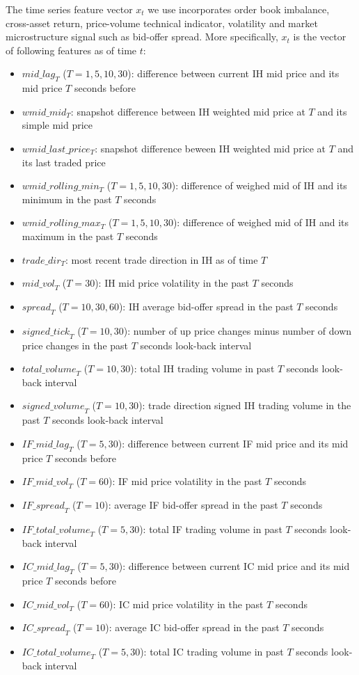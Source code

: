 \documentclass{article}
\begin{document}
The time series feature vector $x_t$ we use incorporates order book imbalance, cross-asset return, price-volume technical indicator, volatility and market microstructure signal such as bid-offer spread. More specifically, $x_t$ is the vector of following features as of time $t$:
\begin{itemize}
\setlength\itemsep{0.1em}
\item ${mid\_lag}_T$ ($T=1,5,10,30$): difference between current IH mid price and its mid price $T$ seconds before
\item ${wmid\_mid_T}$: snapshot difference between IH weighted mid price at $T$ and its simple mid price
\item ${wmid\_last\_price_T}$: snapshot difference beween IH weighted mid price at $T$ and its last traded price
\item ${wmid\_rolling\_min_T}$ ($T=1,5,10,30$):	difference of weighed mid of IH and its minimum in the past $T$ seconds
\item ${wmid\_rolling\_max_T}$ ($T=1,5,10,30$):	difference of weighed mid of IH and its maximum in the past $T$ seconds
\item ${trade\_dir_T}$: most recent trade direction in IH
as of time $T$
\item ${mid\_vol}_T$ ($T=30$): IH mid price volatility in the past $T$ seconds
\item ${spread}_T$ ($T=10,30,60$): IH average bid-offer spread in the past $T$ seconds
\item ${signed\_tick}_T$ ($T=10,30$): number of up price changes minus number of down price changes in the past $T$ seconds look-back interval
\item ${total\_volume}_T$ ($T=10,30$): total IH trading volume in past $T$ seconds look-back interval
\item ${signed\_volume}_T$ ($T=10, 30$): trade direction signed IH trading volume in the past $T$ seconds look-back interval
\item ${IF\_mid\_lag}_T$ ($T=5,30$): difference between current IF mid price and its mid price $T$ seconds before
\item ${IF\_mid\_vol}_T$ ($T=60$): IF mid price volatility in the past $T$ seconds
\item ${IF\_spread}_T$ ($T=10$): average IF bid-offer spread in the past $T$ seconds
\item ${IF\_total\_volume}_T$ ($T=5,30$): total IF trading volume in past $T$ seconds look-back interval
\item ${IC\_mid\_lag}_T$ ($T=5,30$): difference between current IC mid price and its mid price $T$ seconds before
\item ${IC\_mid\_vol}_T$ ($T=60$): IC mid price volatility in the past $T$ seconds
\item ${IC\_spread}_T$ ($T=10$): average IC bid-offer spread in the past $T$ seconds
\item ${IC\_total\_volume}_T$ ($T=5,30$): total IC trading volume in past $T$ seconds look-back interval
\end{itemize}
\end{document}
